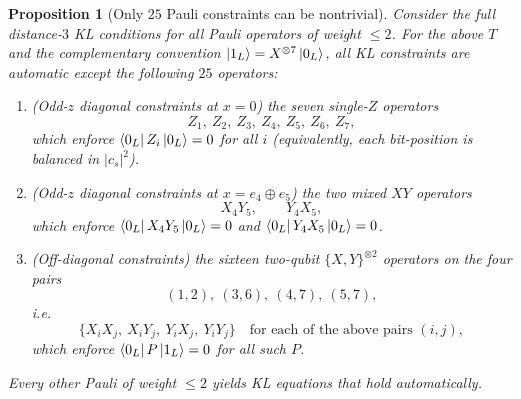 \documentclass[11pt]{article}
\newtheorem{proposition}{Proposition}
\begin{document}
\begin{proposition}[Only $25$ Pauli constraints can be nontrivial]
\label{prop:25-paulis}
Consider the full distance-$3$ KL conditions for all Pauli operators of weight $\le 2$.
For the above $T$ and the complementary convention $\ket{1_L}=X^{\otimes 7}\ket{0_L}$, all KL constraints are
\emph{automatic} except the following $25$ operators:
\begin{enumerate}
\item (Odd-$z$ diagonal constraints at $x=0$) the seven single-$Z$ operators
\[
Z_1,\ Z_2,\ Z_3,\ Z_4,\ Z_5,\ Z_6,\ Z_7,
\]
which enforce $\bra{0_L}Z_i\ket{0_L}=0$ for all $i$ (equivalently, each bit-position is balanced in $|c_s|^2$).
\item (Odd-$z$ diagonal constraints at $x=e_4\oplus e_5$) the two mixed $XY$ operators
\[
X_4Y_5,\qquad Y_4X_5,
\]
which enforce $\bra{0_L}X_4Y_5\ket{0_L}=0$ and $\bra{0_L}Y_4X_5\ket{0_L}=0$.
\item (Off-diagonal constraints) the sixteen two-qubit $\{X,Y\}^{\otimes 2}$ operators on the four pairs
\[
(1,2),\ (3,6),\ (4,7),\ (5,7),
\]
i.e.
\[
\{X_iX_j,\ X_iY_j,\ Y_iX_j,\ Y_iY_j\}\quad \text{for each of the above pairs }(i,j),
\]
which enforce $\bra{0_L}P\ket{1_L}=0$ for all such $P$.
\end{enumerate}
Every other Pauli of weight $\le 2$ yields KL equations that hold automatically.
\end{proposition}
\end{document}
